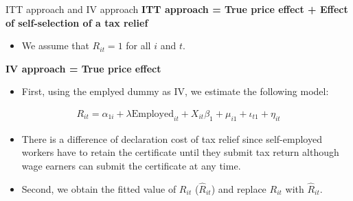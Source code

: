 \documentclass[
  ignorenonframetext,
  aspectratio=169,
]{beamer}
\providecommand{\tightlist}{%
  \setlength{\itemsep}{0pt}\setlength{\parskip}{0pt}}
\begin{document}
\begin{frame}{ITT approach and IV approach}
\protect\hypertarget{itt-approach-and-iv-approach}{}
\textbf{ITT approach = True price effect + Effect of self-selection of a tax relief}

\begin{itemize}
\tightlist
\item
  We assume that \(R_{it} = 1\) for all \(i\) and \(t\).
\end{itemize}

\textbf{IV approach = True price effect}

\begin{itemize}
\tightlist
\item
  First, using the emplyed dummy as IV, we estimate the following model:
\end{itemize}

\begin{align}
  R_{it}
  = \alpha_{1i} + \lambda \text{Employed}_{it} + X_{it} \beta_1
  + \mu_{i1} + \iota_{t1} + \eta_{it} \label{eq:stage1}
\end{align}

\begin{itemize}
\tightlist
\item
  There is a difference of declaration cost of tax relief since self-employed workers have to retain the certificate until they submit tax return although wage earners can submit the certificate at any time.\\
\item
  Second, we obtain the fitted value of \(R_{it}\) (\(\hat{R}_{it}\)) and replace \(R_{it}\) with \(\hat{R}_{it}\).
\end{itemize}
\end{frame}
\end{document}
